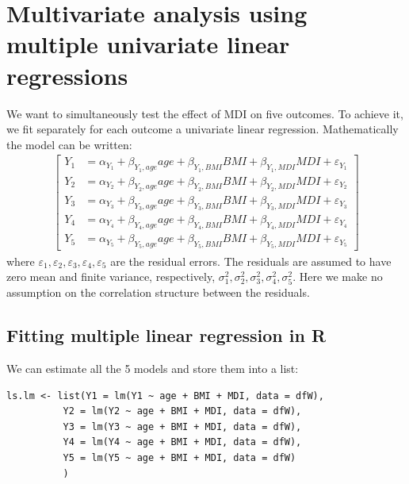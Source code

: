 \documentclass[12pt]{article}
\newcommand\Rlogo{\textbf{\textsf{R}}\xspace} %
\begin{document}
\section{Multivariate analysis using multiple univariate linear regressions}
\label{sec:multipleLM}
We want to simultaneously test the effect of MDI on five outcomes. To
achieve it, we fit separately for each outcome a univariate linear
regression. Mathematically the model can be written:
\begin{align*}
\begin{bmatrix} 
Y_1  &= \alpha_{Y_{1}} + \beta_{Y_1,age} age + \beta_{Y_1,BMI} BMI + \beta_{Y_1,MDI} MDI + \varepsilon_{Y_1} \\
Y_2  &= \alpha_{Y_{2}} + \beta_{Y_2,age} age + \beta_{Y_2,BMI} BMI + \beta_{Y_2,MDI} MDI + \varepsilon_{Y_2} \\
Y_3  &= \alpha_{Y_{3}} + \beta_{Y_3,age} age + \beta_{Y_3,BMI} BMI + \beta_{Y_3,MDI} MDI + \varepsilon_{Y_3} \\
Y_4  &= \alpha_{Y_{4}} + \beta_{Y_4,age} age + \beta_{Y_4,BMI} BMI + \beta_{Y_4,MDI} MDI + \varepsilon_{Y_4} \\
Y_5  &= \alpha_{Y_{5}} + \beta_{Y_5,age} age + \beta_{Y_5,BMI} BMI + \beta_{Y_5,MDI} MDI + \varepsilon_{Y_5} 
\end{bmatrix} 
\end{align*}
where
\(\varepsilon_{1},\varepsilon_{2},\varepsilon_{3},\varepsilon_{4},\varepsilon_{5}\)
are the residual errors. The residuals are assumed to have zero mean
and finite variance, respectively,
\(\sigma^2_{1},\sigma^2_{2},\sigma^2_{3},\sigma^2_{4},\sigma^2_{5}\). Here
we make no assumption on the correlation structure between the
residuals.

\subsection{Fitting multiple linear regression in \Rlogo{}}
\label{sec:org75c5336}

We can estimate all the 5 models and store them into a list:
\lstset{language=r,label= ,caption= ,captionpos=b,numbers=none}
\begin{lstlisting}
ls.lm <- list(Y1 = lm(Y1 ~ age + BMI + MDI, data = dfW),
	      Y2 = lm(Y2 ~ age + BMI + MDI, data = dfW),
	      Y3 = lm(Y3 ~ age + BMI + MDI, data = dfW),
	      Y4 = lm(Y4 ~ age + BMI + MDI, data = dfW),
	      Y5 = lm(Y5 ~ age + BMI + MDI, data = dfW)
	      )
\end{lstlisting}
\end{document}
